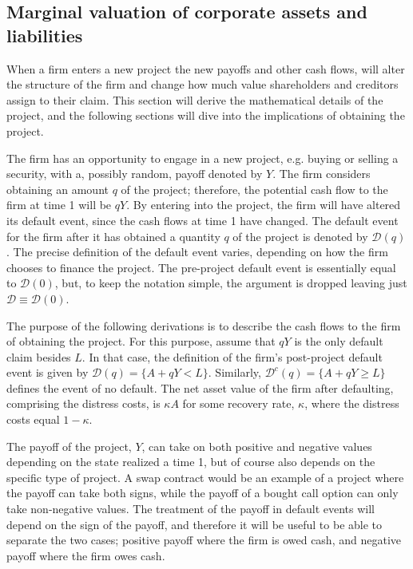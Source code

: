 \documentclass[main.tex]{subfiles}
\begin{document}
    \subsection{Marginal valuation of corporate assets and liabilities}
        When a firm enters a new project the new payoffs and other cash flows,
        will alter the structure of the firm and
        change how much value shareholders and creditors assign to their claim.
        This section will derive the mathematical details of the project,
        and the following sections will dive into the implications of obtaining the project.

        The firm has an opportunity to engage in a new project, e.g. buying or selling a security,
        with a, possibly random, payoff denoted by $Y$.
        The firm considers obtaining an amount $q$ of the project;
        therefore, the potential cash flow to the firm at time 1 will be $qY$.
        By entering into the project, the firm will have altered its default event,
        since the cash flows at time 1 have changed.
        The default event for the firm after it has obtained a quantity $q$ of the project
        is denoted by $\mathcal{D}(q)$.
        The precise definition of the default event varies, 
        depending on how the firm chooses to finance the project.
        The pre-project default event is essentially equal to $\mathcal{D}(0)$,
        but, to keep the notation simple, the argument is dropped leaving just 
        $\mathcal{D}\equiv\mathcal{D}(0)$.

        The purpose of the following derivations is to describe the cash flows
        to the firm of obtaining the project.
        For this purpose, assume that $qY$ is the only default claim besides $L$. 
        In that case, the definition of the firm's post-project default event is given by 
        $\mathcal{D}(q) = \{A + qY < L\}$.
        Similarly, $\mathcal{D}^{c}(q) = \{A + qY \geq L\}$ defines the event of no default.
        The net asset value of the firm after defaulting, comprising the distress costs, is $\kappa A$ for some recovery rate, $\kappa$, where the distress costs equal $1-\kappa$.

        The payoff of the project, $Y$, can take on both positive and negative values
        depending on the state realized a time 1, 
        but of course also depends on the specific type of project. 
        A swap contract would be an example of a project where the payoff can take both signs,
        while the payoff of a bought call option can only take non-negative values.
        The treatment of the payoff in default events will depend on the sign of the payoff,
        and therefore it will be useful to be able to separate the two cases;
        positive payoff where the firm is owed cash,
        and negative payoff where the firm owes cash.
\end{document}
